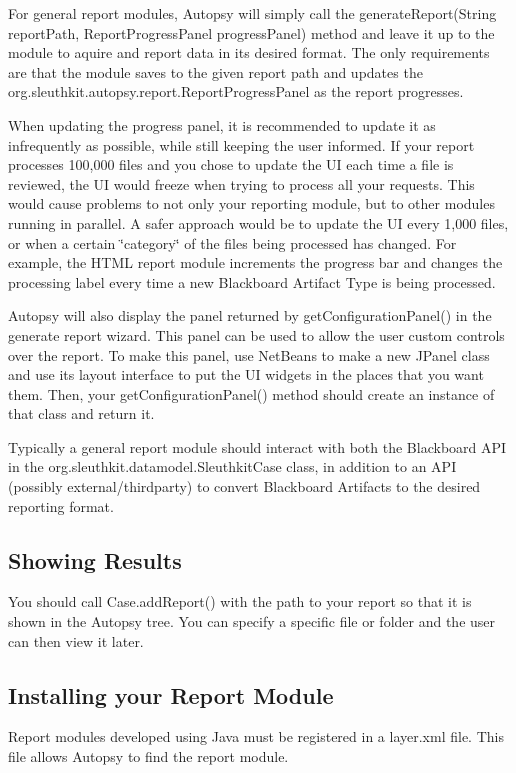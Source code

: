 For general report modules, Autopsy will simply call the generate\+Report(\+String report\+Path, Report\+Progress\+Panel progress\+Panel) method and leave it up to the module to aquire and report data in its desired format. The only requirements are that the module saves to the given report path and updates the org.\+sleuthkit.\+autopsy.\+report.\+Report\+Progress\+Panel as the report progresses.

When updating the progress panel, it is recommended to update it as infrequently as possible, while still keeping the user informed. If your report processes 100,000 files and you chose to update the UI each time a file is reviewed, the UI would freeze when trying to process all your requests. This would cause problems to not only your reporting module, but to other modules running in parallel. A safer approach would be to update the UI every 1,000 files, or when a certain \char`\"{}category\char`\"{} of the files being processed has changed. For example, the H\+T\+ML report module increments the progress bar and changes the processing label every time a new Blackboard Artifact Type is being processed.

Autopsy will also display the panel returned by get\+Configuration\+Panel() in the generate report wizard. This panel can be used to allow the user custom controls over the report. To make this panel, use Net\+Beans to make a new J\+Panel class and use its layout interface to put the UI widgets in the places that you want them. Then, your get\+Configuration\+Panel() method should create an instance of that class and return it.

Typically a general report module should interact with both the Blackboard A\+PI in the org.\+sleuthkit.\+datamodel.\+Sleuthkit\+Case class, in addition to an A\+PI (possibly external/thirdparty) to convert Blackboard Artifacts to the desired reporting format.\hypertarget{mod_report_page_report_create_module_showing}{}\subsection{Showing Results}\label{mod_report_page_report_create_module_showing}
You should call Case.\+add\+Report() with the path to your report so that it is shown in the Autopsy tree. You can specify a specific file or folder and the user can then view it later.\hypertarget{mod_report_page_report_create_module_layer}{}\subsection{Installing your Report Module}\label{mod_report_page_report_create_module_layer}
Report modules developed using Java must be registered in a layer.\+xml file. This file allows Autopsy to find the report module.

